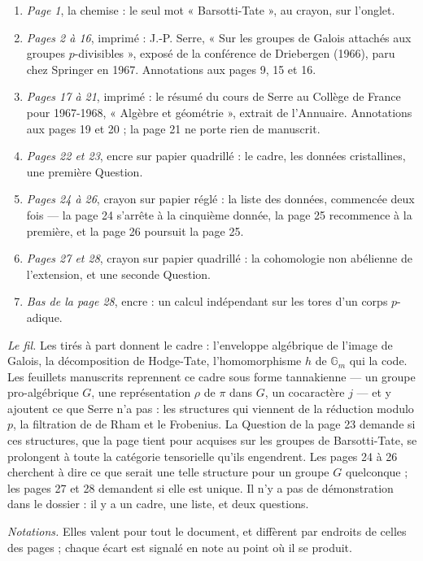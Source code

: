 \documentclass[11pt,a4paper]{article}
\begin{document}
\begin{enumerate}
  \item \emph{Page 1}, la chemise : le seul mot « Barsotti-Tate », au crayon,
  sur l'onglet.
  \item \emph{Pages 2 à 16}, imprimé : J.-P. Serre, « Sur les groupes de
  Galois attachés aux groupes $p$-divisibles », exposé de la conférence de
  Driebergen (1966), paru chez Springer en 1967. Annotations aux pages 9, 15
  et 16.
  \item \emph{Pages 17 à 21}, imprimé : le résumé du cours de Serre au Collège
  de France pour 1967-1968, « Algèbre et géométrie », extrait de l'Annuaire.
  Annotations aux pages 19 et 20 ; la page 21 ne porte rien de manuscrit.
  \item \emph{Pages 22 et 23}, encre sur papier quadrillé : le cadre, les
  données cristallines, une première Question.
  \item \emph{Pages 24 à 26}, crayon sur papier réglé : la liste des données,
  commencée deux fois --- la page 24 s'arrête à la cinquième donnée, la page
  25 recommence à la première, et la page 26 poursuit la page 25.
  \item \emph{Pages 27 et 28}, crayon sur papier quadrillé : la cohomologie
  non abélienne de l'extension, et une seconde Question.
  \item \emph{Bas de la page 28}, encre : un calcul indépendant sur les tores
  d'un corps $p$-adique.
\end{enumerate}

\emph{Le fil.} Les tirés à part donnent le cadre : l'enveloppe algébrique de
l'image de Galois, la décomposition de Hodge-Tate, l'homomorphisme $h$ de
$\mathbb{G}_m$ qui la code. Les feuillets manuscrits reprennent ce cadre sous
forme tannakienne --- un groupe pro-algébrique $G$, une représentation
$\rho$ de $\pi$ dans $G$, un cocaractère $j$ --- et y ajoutent ce que Serre
n'a pas : les structures qui viennent de la réduction modulo $p$, la
filtration de de Rham et le Frobenius. La Question de la page 23 demande si
ces structures, que la page tient pour acquises sur les groupes de
Barsotti-Tate, se prolongent à
toute la catégorie tensorielle qu'ils engendrent. Les pages 24 à 26 cherchent
à dire ce que serait une telle structure pour un groupe $G$ quelconque ; les
pages 27 et 28 demandent si elle est unique. Il n'y a pas de démonstration
dans le dossier : il y a un cadre, une liste, et deux questions.

\emph{Notations.} Elles valent pour tout le document, et diffèrent par
endroits de celles des pages ; chaque écart est signalé en note au point où il
se produit.
\end{document}
